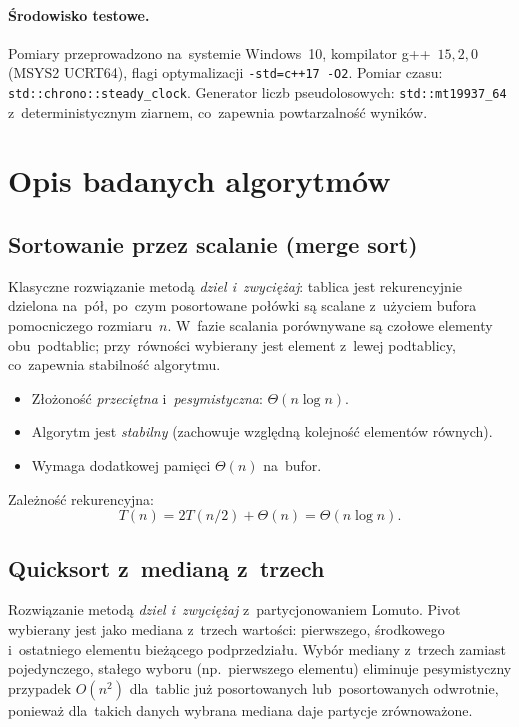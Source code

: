 \documentclass[11pt,a4paper]{article}
\begin{document}
\paragraph{Środowisko testowe.}
Pomiary przeprowadzono na~systemie Windows~10, kompilator g++~$15{,}2{,}0$ (MSYS2 UCRT64),
flagi optymalizacji \texttt{-std=c++17~-O2}. Pomiar czasu: \texttt{std::chrono::steady\_clock}.
Generator liczb pseudolosowych: \texttt{std::mt19937\_64} z~deterministycznym ziarnem,
co~zapewnia powtarzalność wyników.

\section{Opis badanych algorytmów}

\subsection{Sortowanie przez scalanie (merge sort)}

Klasyczne rozwiązanie metodą \emph{dziel i~zwyciężaj}: tablica jest rekurencyjnie dzielona na~pół,
po~czym posortowane połówki są scalane z~użyciem bufora pomocniczego rozmiaru~$n$. W~fazie scalania
porównywane są czołowe elementy obu~podtablic; przy~równości wybierany jest element z~lewej
podtablicy, co~zapewnia stabilność algorytmu.

\begin{itemize}[nosep]
  \item Złożoność \emph{przeciętna} i~\emph{pesymistyczna}: $\Theta(n\log n)$.
  \item Algorytm jest \emph{stabilny} (zachowuje względną kolejność elementów równych).
  \item Wymaga dodatkowej pamięci $\Theta(n)$ na~bufor.
\end{itemize}

Zależność rekurencyjna:
\[
T(n) = 2T(n/2) + \Theta(n) = \Theta(n\log n).
\]

\subsection{Quicksort z~medianą z~trzech}

Rozwiązanie metodą \emph{dziel i~zwyciężaj} z~partycjonowaniem Lomuto. Pivot wybierany jest jako
mediana z~trzech wartości: pierwszego, środkowego i~ostatniego elementu bieżącego podprzedziału.
Wybór mediany z~trzech zamiast pojedynczego, stałego wyboru (np.~pierwszego elementu) eliminuje
pesymistyczny przypadek $O(n^2)$ dla~tablic już posortowanych lub~posortowanych odwrotnie, ponieważ
dla~takich danych wybrana mediana daje partycje zrównoważone.
\end{document}
